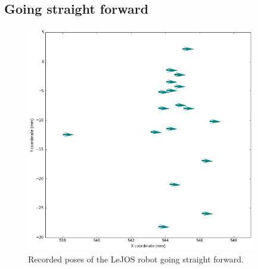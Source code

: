\documentclass[paper=a4, fontsize=11pt]{scrartcl} %
\begin{document}
    \subsection{Going straight forward}
    \begin{figure}[h!]
        \begin{center}
            \setlength{\fboxsep}{0.5pt} %
            \setlength{\fboxrule}{0.5pt}
            \includegraphics[width=10cm,fbox]{images/poses_plot_1_straight.png}
            \caption{Recorded poses of the LeJOS robot going straight forward.}
        \end{center}
    \end{figure}
\end{document}

